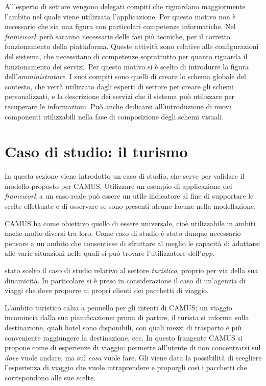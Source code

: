All'esperto di settore vengono delegati compiti che riguardano maggiormente l'ambito nel quale viene utilizzata l'applicazione. Per questo motivo non è necessario che sia una figura con particolari competenze informatiche. Nel \emph{framework} però saranno necessarie delle fasi più tecniche, per il corretto funzionamento della piattaforma. Queste attività sono relative alle configurazioni del sistema, che necessitano di competenze soprattutto per quanto riguarda il funzionamento dei servizi. Per questo motivo si è scelto di introdurre la figura dell'\emph{amministratore}. I suoi compiti sono quelli di creare lo schema globale del contesto, che verrà utilizzato dagli esperti di settore per creare gli schemi personalizzati, e la descrizione dei servizi che il sistema può utilizzare per recuperare le informazioni. Può anche dedicarsi all'introduzione di nuovi componenti utilizzabili nella fase di composizione degli schemi visuali.

\section{Caso di studio: il turismo\label{sec:caso-studio-turismo}}

In questa sezione viene introdotto un caso di studio, che serve per validare il modello proposto per CAMUS. Utilizzare un esempio di applicazione del \emph{framework} a un caso reale può essere un utile indicatore al fine di supportare le scelte effettuate e di osservare se sono presenti alcune lacune nella modellazione.

CAMUS ha come obiettivo quello di essere universale, cioè utilizzabile in ambiti anche molto diversi tra loro. Come caso di studio è stato dunque necessario pensare a un ambito che consentisse di sfruttare al meglio le capacità di adattarsi alle varie situazioni nelle quali si può trovare l'utilizzatore dell'\emph{app}.

\upe stato scelto il caso di studio relativo al settore \emph{turistico}, proprio per via della sua dinamicità. In particolare si è preso in considerazione il caso di un'agenzia di viaggi che deve proporre ai propri clienti dei pacchetti di viaggio.

L'ambito turistico calza a pennello per gli intenti di CAMUS; un viaggio incomincia dalla sua pianificazione: prima di partire, il turista si informa sulla destinazione, quali hotel sono disponibili, con quali mezzi di trasporto è più conveniente raggiungere la destinazione, ecc. In questo frangente CAMUS si propone come  di esperienze di viaggio: permette all'utente di non concentrarsi sul \emph{dove} vuole andare, ma sul \emph{cosa} vuole fare. Gli viene data la possibilità di scegliere l'esperienza di viaggio che vuole intraprendere e proporgli così i pacchetti che corrispondono alle sue scelte.

